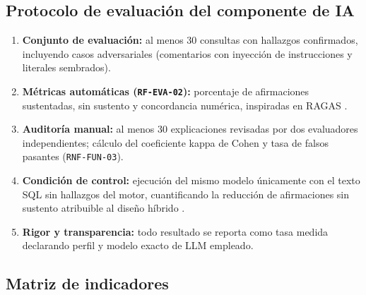 \documentclass[12pt,a4paper]{article}
\begin{document}
\subsection{Protocolo de evaluación del componente de IA}

\begin{enumerate}[leftmargin=1.5em]
    \item \textbf{Conjunto de evaluación:} al menos 30 consultas con hallazgos confirmados, incluyendo casos adversariales (comentarios con inyección de instrucciones y literales sembrados).
    \item \textbf{Métricas automáticas (\texttt{RF-EVA-02}):} porcentaje de afirmaciones sustentadas, sin sustento y concordancia numérica, inspiradas en RAGAS \cite{es-ragas}.
    \item \textbf{Auditoría manual:} al menos 30 explicaciones revisadas por dos evaluadores independientes; cálculo del coeficiente kappa de Cohen \cite{cohen-kappa} y tasa de falsos pasantes (\texttt{RNF-FUN-03}).
    \item \textbf{Condición de control:} ejecución del mismo modelo únicamente con el texto SQL sin hallazgos del motor, cuantificando la reducción de afirmaciones sin sustento atribuible al diseño híbrido \cite{zhou-dbot}.
    \item \textbf{Rigor y transparencia:} todo resultado se reporta como tasa medida declarando perfil y modelo exacto de LLM empleado.
\end{enumerate}

\subsection{Matriz de indicadores}
\end{document}

